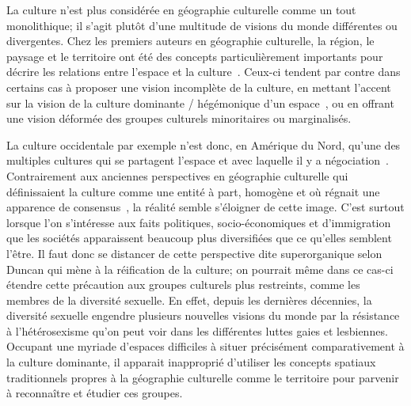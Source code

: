 La culture n'est plus considérée en géographie culturelle comme un tout monolithique; il s'agit plutôt d'une multitude de visions du monde différentes ou divergentes. 
Chez les premiers auteurs en géographie culturelle, la région, le paysage et le territoire ont été des concepts particulièrement importants  pour décrire les relations entre l'espace et la culture~\citep{Bonnemaison1981,Monnet1998,DiMeo1998,}. 
Ceux-ci tendent par contre dans certains cas à proposer une vision incomplète de la culture, en mettant l'accent sur la vision de la culture dominante / hégémonique d'un espace~\citep[11-12]{Duncan1993}, ou en offrant une vision déformée des groupes culturels minoritaires ou marginalisés.

La culture occidentale par exemple n'est donc, en Amérique du Nord, qu'une des multiples cultures qui se partagent l'espace et avec laquelle il y a négociation~\citep[11]{Duncan1993}. 
Contrairement aux anciennes perspectives en géographie culturelle qui définissaient la culture comme une entité à part, homogène et où régnait une apparence de consensus~\citep{Duncan1980}, la réalité semble s'éloigner de cette image. 
C'est surtout lorsque l'on s'intéresse aux faits politiques, socio-économiques et d'immigration que les sociétés apparaissent beaucoup plus diversifiées que ce qu'elles semblent l'être. 
Il faut donc se distancer de cette perspective dite superorganique selon Duncan qui mène à la réification de la culture; on pourrait même dans ce cas-ci étendre cette précaution aux groupes culturels plus restreints, comme les membres de la diversité sexuelle. 
En effet, depuis les dernières décennies, la diversité sexuelle engendre plusieurs nouvelles visions du monde par la résistance à l'hétérosexisme qu'on peut voir dans les différentes luttes gaies et lesbiennes.
Occupant une myriade d'espaces difficiles à situer précisément comparativement à la culture dominante, il apparait inapproprié d'utiliser les concepts spatiaux traditionnels propres à la géographie culturelle comme le territoire pour parvenir à reconnaître et étudier ces groupes.

